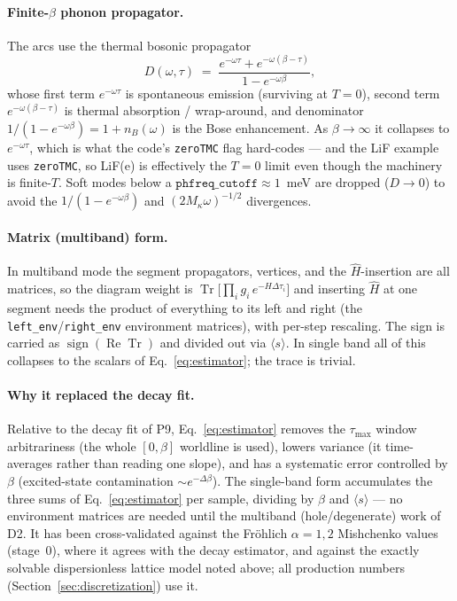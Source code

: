 \documentclass[11pt]{article}
\begin{document}
\paragraph{Finite-$\beta$ phonon propagator.}
The arcs use the thermal bosonic propagator
\begin{equation}
  D(\omega,\tau) \;=\; \frac{e^{-\omega\tau}+e^{-\omega(\beta-\tau)}}{1-e^{-\omega\beta}},
  \label{eq:dph}
\end{equation}
whose first term $e^{-\omega\tau}$ is spontaneous emission (surviving at $T=0$), second
term $e^{-\omega(\beta-\tau)}$ is thermal absorption / wrap-around, and denominator
$1/(1-e^{-\omega\beta})=1+n_{B}(\omega)$ is the Bose enhancement. As $\beta\to\infty$ it
collapses to $e^{-\omega\tau}$, which is what the code's \texttt{zeroTMC} flag
hard-codes --- and the LiF example uses \texttt{zeroTMC}, so LiF(e) is effectively the
$T=0$ limit even though the machinery is finite-$T$. Soft modes below a
$\texttt{phfreq\_cutoff}\approx1$~meV are dropped ($D\to0$) to avoid the
$1/(1-e^{-\omega\beta})$ and $(2M_{\kappa}\omega)^{-1/2}$ divergences.

\paragraph{Matrix (multiband) form.}

In multiband mode the segment propagators, vertices, and the $\hat H$-insertion are all matrices, so the diagram weight is $\operatorname{Tr}\!\bigl[\prod_{i}g_{i}\,e^{-H\Delta\tau_{i}}\bigr]$ and inserting $\hat H$ at one segment needs the product of everything to its left and right (the \texttt{left\_env}/\texttt{right\_env} environment matrices), with per-step rescaling. The sign is carried as $\operatorname{sign}(\operatorname{Re}\operatorname{Tr})$ and divided out via $\langle s\rangle$. In single band all of this collapses to the scalars of Eq.~\eqref{eq:estimator}; the trace is trivial.

\paragraph{Why it replaced the decay fit.}

Relative to the decay fit of P9, Eq.~\eqref{eq:estimator} removes the $\tau_{\max}$ window arbitrariness (the whole $[0,\beta]$ worldline is used), lowers variance (it time-averages rather than reading one slope), and has a systematic error controlled by $\beta$ (excited-state contamination $\sim e^{-\Delta\beta}$). The single-band form accumulates the three sums of Eq.~\eqref{eq:estimator} per sample, dividing by $\beta$ and $\langle s\rangle$ --- no environment matrices are needed until the multiband (hole/degenerate) work of D2. It has been cross-validated against the Fr\"ohlich $\alpha=1,2$ Mishchenko values (stage~0), where it agrees with the decay estimator, and against the exactly solvable dispersionless lattice model noted above; all production numbers (Section~\ref{sec:discretization}) use it.
\end{document}
